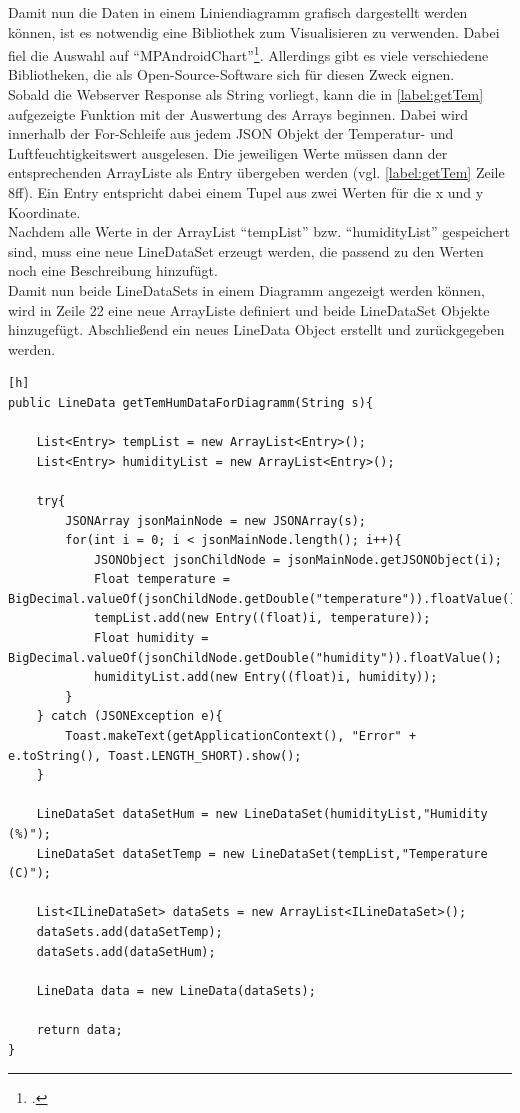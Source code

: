 Damit nun die Daten in einem Liniendiagramm grafisch dargestellt werden können, ist es notwendig eine Bibliothek zum Visualisieren zu verwenden. Dabei fiel die Auswahl auf \enquote{MPAndroidChart}\footcite{https://github.com/PhilJay/MPAndroidChart}. Allerdings gibt es viele verschiedene Bibliotheken, die als Open-Source-Software sich für diesen Zweck eignen.\\
Sobald die Webserver Response als String vorliegt, kann die in \autoref{label:getTem} aufgezeigte Funktion mit der Auswertung des Arrays beginnen. Dabei wird innerhalb der For-Schleife aus jedem \ac{JSON} Objekt der Temperatur- und Luftfeuchtigkeitswert ausgelesen. Die jeweiligen Werte müssen dann der entsprechenden ArrayListe als Entry übergeben werden (vgl. \autoref{label:getTem} Zeile 8ff). Ein Entry entspricht dabei einem Tupel aus zwei Werten für die x und y Koordinate.\\Nachdem alle Werte in der ArrayList \enquote{tempList} bzw. \enquote{humidityList} gespeichert sind, muss eine neue LineDataSet erzeugt werden, die passend zu den Werten noch eine Beschreibung hinzufügt. \\
Damit nun beide LineDataSets in einem Diagramm angezeigt werden können, wird in Zeile 22 eine neue ArrayListe definiert und beide LineDataSet Objekte hinzugefügt. Abschließend ein neues LineData Object erstellt und zurückgegeben werden. 

\begin{lstlisting}[label=label:getTem][h]
public LineData getTemHumDataForDiagramm(String s){

	List<Entry> tempList = new ArrayList<Entry>();
	List<Entry> humidityList = new ArrayList<Entry>();
	
	try{
		JSONArray jsonMainNode = new JSONArray(s);
		for(int i = 0; i < jsonMainNode.length(); i++){
			JSONObject jsonChildNode = jsonMainNode.getJSONObject(i);
			Float temperature = BigDecimal.valueOf(jsonChildNode.getDouble("temperature")).floatValue();
			tempList.add(new Entry((float)i, temperature));
			Float humidity = BigDecimal.valueOf(jsonChildNode.getDouble("humidity")).floatValue();
			humidityList.add(new Entry((float)i, humidity));
		}
	} catch (JSONException e){
		Toast.makeText(getApplicationContext(), "Error" + e.toString(), Toast.LENGTH_SHORT).show();
	}
	
	LineDataSet dataSetHum = new LineDataSet(humidityList,"Humidity (%)");	
	LineDataSet dataSetTemp = new LineDataSet(tempList,"Temperature (C)");
		
	List<ILineDataSet> dataSets = new ArrayList<ILineDataSet>();
	dataSets.add(dataSetTemp);
	dataSets.add(dataSetHum);
	
	LineData data = new LineData(dataSets);
	
	return data;
}
\end{lstlisting}


